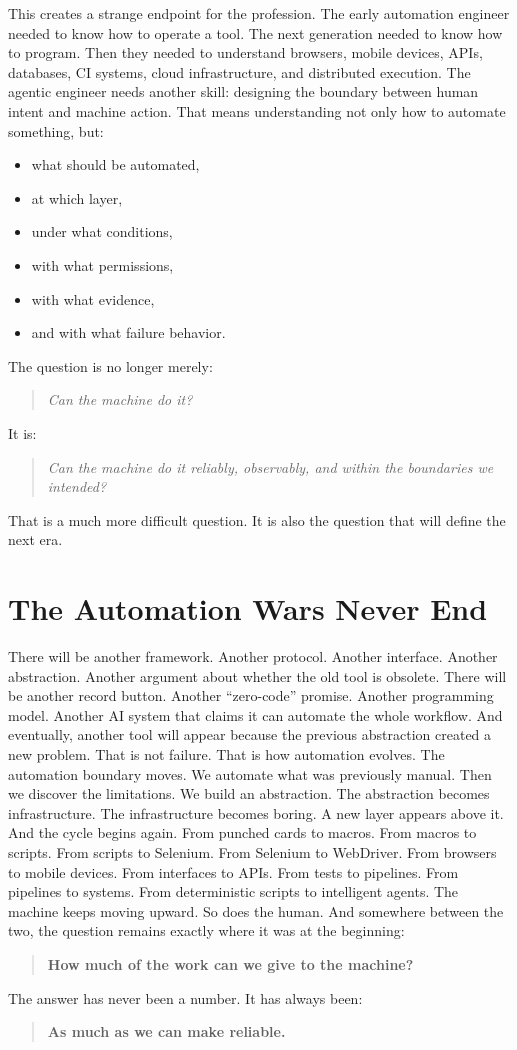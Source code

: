 \documentclass[11pt,twoside]{book}
\begin{document}
This creates a strange endpoint for the profession.
The early automation engineer needed to know how to operate a tool.
The next generation needed to know how to program.
Then they needed to understand browsers, mobile devices, APIs, databases, CI systems, cloud infrastructure, and distributed execution.
The agentic engineer needs another skill:
designing the boundary between human intent and machine action.
That means understanding not only how to automate something, but:
\begin{itemize}[nosep]
    \item what should be automated,
    \item at which layer,
    \item under what conditions,
    \item with what permissions,
    \item with what evidence,
    \item and with what failure behavior.
\end{itemize}

The question is no longer merely:
\begin{quote}
\emph{Can the machine do it?}
\end{quote}
It is:
\begin{quote}
\emph{Can the machine do it reliably, observably, and within the boundaries we intended?}
\end{quote}
That is a much more difficult question.
It is also the question that will define the next era.

\section*{The Automation Wars Never End}

There will be another framework.
Another protocol.
Another interface.
Another abstraction.
Another argument about whether the old tool is obsolete.
There will be another record button.
Another ``zero-code'' promise.
Another programming model.
Another AI system that claims it can automate the whole workflow.
And eventually, another tool will appear because the previous abstraction created a new problem.
That is not failure.
That is how automation evolves.
The automation boundary moves.
We automate what was previously manual.
Then we discover the limitations.
We build an abstraction.
The abstraction becomes infrastructure.
The infrastructure becomes boring.
A new layer appears above it.
And the cycle begins again.
From punched cards to macros.
From macros to scripts.
From scripts to Selenium.
From Selenium to WebDriver.
From browsers to mobile devices.
From interfaces to APIs.
From tests to pipelines.
From pipelines to systems.
From deterministic scripts to intelligent agents.
The machine keeps moving upward.
So does the human.
And somewhere between the two, the question remains exactly where it was at the beginning:
\begin{quote}
\textbf{How much of the work can we give to the machine?}
\end{quote}
The answer has never been a number.
It has always been:
\begin{quote}
\textbf{As much as we can make reliable.}
\end{quote}
\end{document}
